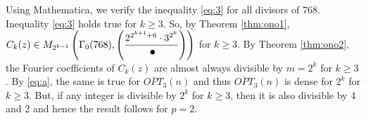 \documentclass[12pt,reqno]{amsart}
\numberwithin{equation}{section}
\newcommand{\opt}{\overline{OPT}}
\begin{document}
Using Mathematica, we verify the inequality \eqref{eq:3} for all divisors of $768$. Inequality \eqref{eq:3} holds true for $k\geq3$. So, by Theorem \ref{thm:ono1}, $C_k(z)\in M_{2^{k-1}}\left(\Gamma_0(768),\left(\dfrac{2^{2^{k+1}+6}\cdot3^{2^k}}{\tikz\draw[black,fill=black] (0,0) circle (.5ex);}\right)\right)$ for $k\geq3$. By Theorem \ref{thm:ono2}, the Fourier coefficients of $C_k(z)$ are almost always divisible by $m=2^{k}$ for $k\geq3$. By \eqref{eq:a}, the same is true for $\opt_3(n)$ and thus $\opt_3(n)$ is dense for $2^k$ for $k\geq3$. But, if any integer is divisible by $2^k$ for $k\geq3$, then it is also divisible by 4 and 2 and hence the result follows for $p=2$.




\end{document}
